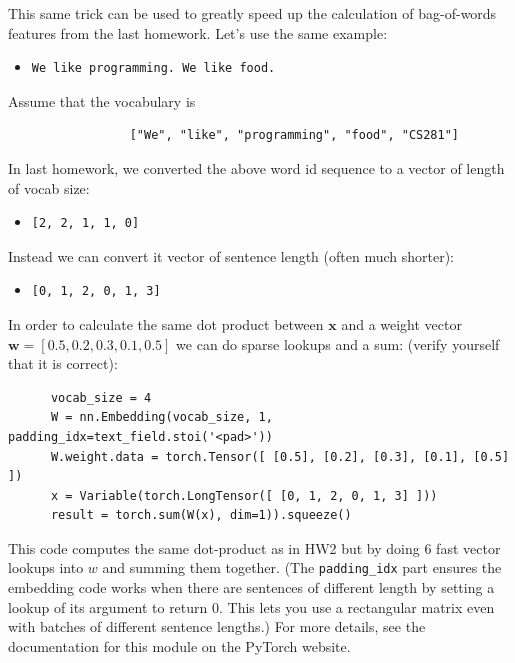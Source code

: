 \documentclass[submit]{harvardml}
\theoremstyle{plain}
\begin{document}
\noindent

This same trick can be used to greatly speed up
the calculation of bag-of-words features from the
last homework. Let's use the same example:
\begin{itemize}
\item \begin{verbatim}We like programming. We like food.\end{verbatim}
\end{itemize}
Assume that the vocabulary is
\begin{verbatim}
                 ["We", "like", "programming", "food", "CS281"]
\end{verbatim}

In last homework, we converted the above word id sequence to a vector of length of vocab size:
\begin{itemize}
\item \begin{verbatim}[2, 2, 1, 1, 0]\end{verbatim}
\end{itemize}


Instead we can convert it vector of sentence length (often much shorter):
\begin{itemize}
\item \begin{verbatim}[0, 1, 2, 0, 1, 3]\end{verbatim}
\end{itemize}

\noindent In order to calculate the same dot product between $\mathbf{x}$ and a weight vector $\mathbf{w}=[0.5,0.2,0.3,0.1,0.5]$ we can do sparse lookups and a sum:
(verify yourself that it is correct):
  \begin{verbatim}
      vocab_size = 4
      W = nn.Embedding(vocab_size, 1, padding_idx=text_field.stoi('<pad>'))
      W.weight.data = torch.Tensor([ [0.5], [0.2], [0.3], [0.1], [0.5] ])
      x = Variable(torch.LongTensor([ [0, 1, 2, 0, 1, 3] ]))
      result = torch.sum(W(x), dim=1)).squeeze()
  \end{verbatim}

This code computes the same dot-product as in HW2 but by doing 6 fast vector lookups
into $w$ and summing them together. (The \texttt{padding\_idx} part ensures
the embedding code works when there are sentences of different length by setting
a lookup of its argument to return 0. This lets you use a rectangular matrix even
with batches of different sentence lengths.) For more details, see the documentation for this module on the PyTorch website.
\end{document}
